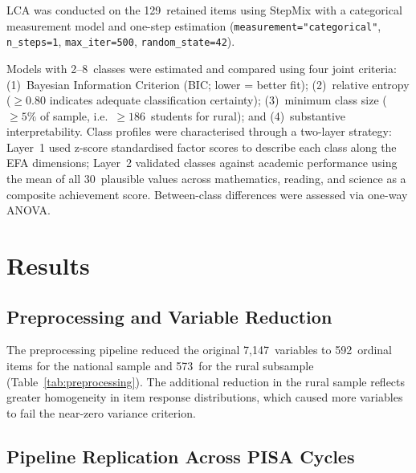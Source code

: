 \documentclass[twocolumn,12pt]{article}
\begin{document}
LCA was conducted on the 129~retained items using StepMix
\parencite{morin2025stepmix} with a categorical measurement model and
one-step estimation (\texttt{measurement="categorical"},
\texttt{n\_steps=1}, \texttt{max\_iter=500}, \texttt{random\_state=42}).

Models with 2--8~classes were estimated and compared using four joint
criteria: (1)~Bayesian Information Criterion (BIC; lower = better fit);
(2)~relative entropy ($\geq 0.80$ indicates adequate classification
certainty); (3)~minimum class size ($\geq 5\%$ of sample,
i.e.\ $\geq 186$~students for rural); and (4)~substantive
interpretability. Class profiles were characterised through a two-layer
strategy: Layer~1 used z-score standardised factor scores to describe
each class along the EFA dimensions; Layer~2 validated classes against
academic performance using the mean of all 30~plausible values across
mathematics, reading, and science as a composite achievement score.
Between-class differences were assessed via one-way ANOVA.


\section{Results}

\subsection{Preprocessing and Variable Reduction}

The preprocessing pipeline reduced the original 7,147~variables to
592~ordinal items for the national sample and 573~for the rural subsample
(Table~\ref{tab:preprocessing}). The additional reduction in the rural
sample reflects greater homogeneity in item response distributions, which
caused more variables to fail the near-zero variance criterion.

\subsection{Pipeline Replication Across PISA Cycles}
\end{document}
